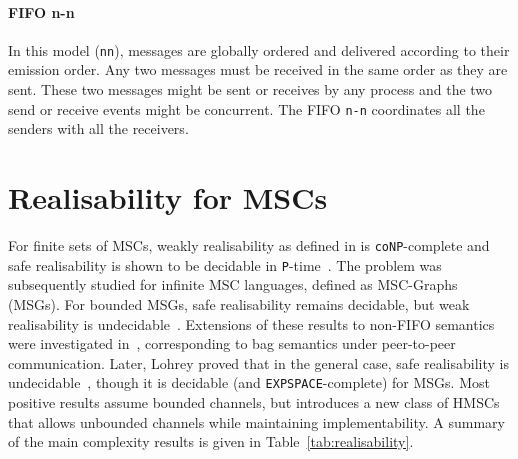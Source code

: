 
\paragraph{FIFO n-n}
In this model (\verb|nn|), messages are globally ordered and delivered according to 
their emission order. Any two messages must be received in the same order 
as they are sent. These two messages might be sent or receives by any process 
and the two send or receive events might be concurrent. The FIFO \verb|n-n| 
coordinates all the senders with all the receivers.


\section{Realisability for MSCs}

For finite sets of MSCs, weakly realisability as defined in 
\cite{alur2005realizability} is \verb|coNP|-complete and safe 
realisability is shown to be decidable in \verb|P|-time~\cite{alur2005realizability}.
The problem was subsequently studied for infinite MSC languages, defined 
as MSC-Graphs (MSGs). For bounded MSGs, safe realisability 
remains decidable, but weak realisability 
is undecidable~\cite{alur2005realizability}. Extensions of these results to non-FIFO 
semantics were investigated in~\cite{morin2002recognizable}, corresponding 
to bag semantics under peer-to-peer communication. 
Later, Lohrey proved that in the general case, safe realisability 
is undecidable~\cite{lohrey2003realizability}, though it is decidable (and 
\verb|EXPSPACE|-complete) for MSGs. %
Most positive results assume bounded channels, but \cite{bollig2025high} introduces 
a new class of HMSCs that allows unbounded channels while maintaining implementability.
A summary of the main complexity results is given in Table~\ref{tab:realisability}.

